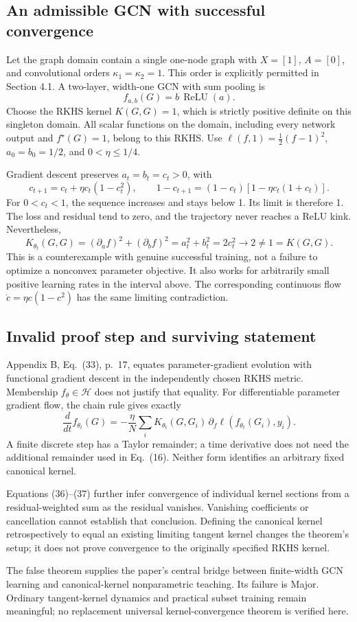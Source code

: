 \documentclass[10pt]{article}
\begin{document}
\subsection*{An admissible GCN with successful convergence}
Let the graph domain contain a single one-node graph with \(X=[1]\), \(A=[0]\), and convolutional orders \(\kappa_1=\kappa_2=1\). This order is explicitly permitted in Section 4.1. A two-layer, width-one GCN with sum pooling is \[f_{a,b}(G)=b\,\operatorname{ReLU}(a).\] Choose the RKHS kernel \(K(G,G)=1\), which is strictly positive definite on this singleton domain. All scalar functions on the domain, including every network output and \(f^\star(G)=1\), belong to this RKHS. Use \(\ell(f,1)=\tfrac12(f-1)^2\), \(a_0=b_0=1/2\), and \(0<\eta\leq1/4\).\par
Gradient descent preserves \(a_t=b_t=c_t>0\), with \[c_{t+1}=c_t+\eta c_t(1-c_t^2),\qquad
 1-c_{t+1}=(1-c_t)[1-\eta c_t(1+c_t)].\] For \(0<c_t<1\), the sequence increases and stays below 1. Its limit is therefore 1. The loss and residual tend to zero, and the trajectory never reaches a ReLU kink. Nevertheless, \[K_{\theta_t}(G,G)
 =(\partial_a f)^2+(\partial_b f)^2
 =a_t^2+b_t^2=2c_t^2\longrightarrow2\ne1=K(G,G).\] This is a counterexample with genuine successful training, not a failure to optimize a nonconvex parameter objective. It also works for arbitrarily small positive learning rates in the interval above. The corresponding continuous flow \(\dot c=\eta c(1-c^2)\) has the same limiting contradiction.\par
\subsection*{Invalid proof step and surviving statement}
Appendix B, Eq. (33), p. 17, equates parameter-gradient evolution with functional gradient descent in the independently chosen RKHS metric. Membership \(f_\theta\in\mathcal H\) does not justify that equality. For differentiable parameter gradient flow, the chain rule gives exactly \[\frac{d}{dt}f_{\theta_t}(G)
 =-\frac{\eta}{N}\sum_i
 K_{\theta_t}(G,G_i)\,\partial_f\ell(f_{\theta_t}(G_i),y_i).\] A finite discrete step has a Taylor remainder; a time derivative does not need the additional remainder used in Eq. (16). Neither form identifies an arbitrary fixed canonical kernel.\par
Equations (36)–(37) further infer convergence of individual kernel sections from a residual-weighted sum as the residual vanishes. Vanishing coefficients or cancellation cannot establish that conclusion. Defining the canonical kernel retrospectively to equal an existing limiting tangent kernel changes the theorem’s setup; it does not prove convergence to the originally specified RKHS kernel.\par
The false theorem supplies the paper’s central bridge between finite-width GCN learning and canonical-kernel nonparametric teaching. Its failure is Major. Ordinary tangent-kernel dynamics and practical subset training remain meaningful; no replacement universal kernel-convergence theorem is verified here.\par
\end{document}
